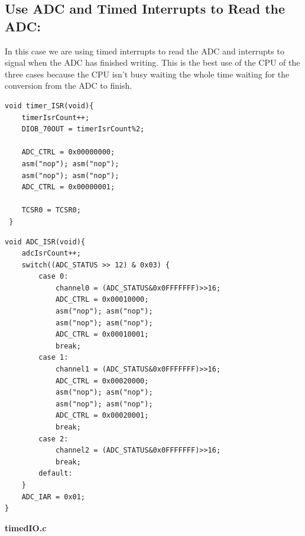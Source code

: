 \documentclass[twoside]{article}
\begin{document}
\begin{multicols}{2}

\section{Use ADC and Timed Interrupts to Read the ADC:}

In this case we are using timed interrupts to read the ADC and interrupts to signal when the ADC has finished writing. This is the best use of the CPU of the three cases because the CPU isn't busy waiting the whole time waiting for the conversion from the ADC to finish. 

\begin{lstlisting}[frame=single]
void timer_ISR(void){
	timerIsrCount++;
	DIOB_70OUT = timerIsrCount%2;

	ADC_CTRL = 0x00000000;
	asm("nop"); asm("nop");
	asm("nop"); asm("nop");
	ADC_CTRL = 0x00000001;

	TCSR0 = TCSR0;
 }
 \end{lstlisting}
 \begin{lstlisting}[frame=single]
 void ADC_ISR(void){
	adcIsrCount++;
	switch((ADC_STATUS >> 12) & 0x03) {
		case 0:
			channel0 = (ADC_STATUS&0x0FFFFFFF)>>16;
			ADC_CTRL = 0x00010000;
			asm("nop"); asm("nop");
			asm("nop"); asm("nop");
			ADC_CTRL = 0x00010001;
			break;
		case 1:
			channel1 = (ADC_STATUS&0x0FFFFFFF)>>16;
			ADC_CTRL = 0x00020000;
			asm("nop"); asm("nop");
			asm("nop"); asm("nop");
			ADC_CTRL = 0x00020001;
			break;
		case 2:
			channel2 = (ADC_STATUS&0x0FFFFFFF)>>16;
			break;
		default:
	}
	ADC_IAR = 0x01;
}
\end{lstlisting}

\end{multicols}
\newpage
\noindent \textbf{timedIO.c}
\vspace{-5mm}
\end{document}

